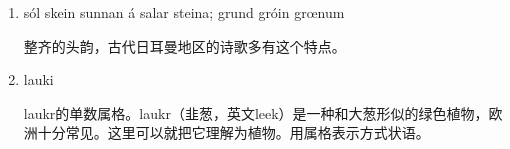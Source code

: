 \begin{grammar*}{}
    \begin{enumerate}[leftmargin=*]
        \item sól skein sunnan á salar steina; grund gróin grœnum

              整齐的头韵，古代日耳曼地区的诗歌多有这个特点。

        \item lauki

              laukr的单数属格。laukr（韭葱，英文leek）是一种和大葱形似的绿色植物，欧洲十分常见。这里可以就把它理解为植物。用属格表示方式状语。
    \end{enumerate}
\end{grammar*}
\hspace*{\fill}\\ %

